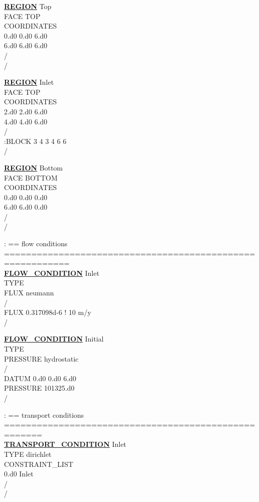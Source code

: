 \documentclass[12pt]{article}
\begin{document}
\noindent
\hyperlink{target_region}{\bf REGION} Top\\
FACE TOP\\
COORDINATES\\
0.d0 0.d0 6.d0\\
6.d0 6.d0 6.d0\\
/\\
/

\noindent
\hyperlink{target_region}{\bf REGION} Inlet\\
FACE TOP\\
COORDINATES\\
2.d0 2.d0 6.d0\\
4.d0 4.d0 6.d0\\
/\\
:BLOCK 3 4 3 4 6 6\\
/

\noindent
\hyperlink{target_region}{\bf REGION} Bottom\\
FACE BOTTOM\\
COORDINATES\\
0.d0 0.d0 0.d0\\
6.d0 6.d0 0.d0\\
/\\
/

\noindent
: == flow conditions ==========================================================\\
\hyperlink{target_flow_cond}{\bf FLOW\_CONDITION} Inlet\\
TYPE\\
FLUX neumann\\
/\\
FLUX 0.317098d-6 ! 10 m/y\\
/

\noindent
\hyperlink{target_flow_cond}{\bf FLOW\_CONDITION} Initial\\
TYPE\\
PRESSURE hydrostatic\\
/\\
DATUM 0.d0 0.d0 6.d0\\
PRESSURE 101325.d0\\
/

\noindent
: == transport conditions =====================================================\\
\hyperlink{target_trans_cond}{\bf TRANSPORT\_CONDITION} Inlet\\
TYPE dirichlet\\
CONSTRAINT\_LIST\\
0.d0 Inlet\\
/\\
/
\end{document}
